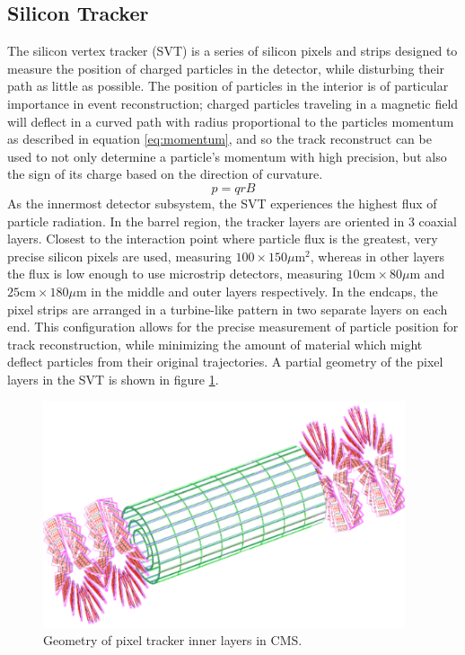 \subsection{Silicon Tracker} 
\label{subsec:tracker}
The silicon vertex tracker (SVT) is a series of silicon pixels and strips designed to measure the position of charged particles in the detector, while disturbing their path as little as possible. The position of particles in the interior is of particular importance in event reconstruction; charged particles traveling in a magnetic field will deflect in a curved path with radius proportional to the particles momentum as described in equation \ref{eq:momentum}, and so the track reconstruct can be used to not only determine a particle's momentum with high precision, but also the sign of its charge based on the direction of curvature.
\begin{equation}
	\label{eq:momentum}
	p = qrB
\end{equation}
As the innermost detector subsystem, the SVT experiences the highest flux of particle radiation. In the barrel region, the tracker layers are oriented in 3 coaxial layers. Closest to the interaction point where particle flux is the greatest, very precise silicon pixels are used, measuring $100\times150 \mu \text{m}^2$, whereas in other layers the flux is low enough to use microstrip detectors, measuring $10 \text{cm}\times80\mu \text{m}$ and  $25 \text{cm}\times180\mu \text{m}$ in the middle and outer layers respectively. In the endcaps, the pixel strips are arranged in a turbine-like pattern in two separate layers on each end. This configuration allows for the precise measurement of particle position for track reconstruction, while minimizing the amount of material which might deflect particles from their original trajectories. A partial geometry of the pixel layers in the SVT is shown in figure \ref{fig:pixelLayout}.
\begin{figure}
	\centering
	\includegraphics[width=0.95\textwidth]{detector/figs/trackerGeometry}
	\caption{Geometry of pixel tracker inner layers in CMS.}
	\label{fig:pixelLayout}
\end{figure}


